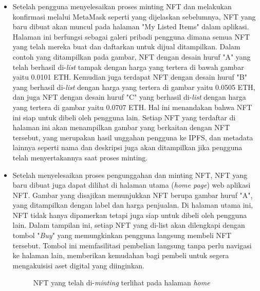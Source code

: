 \begin{itemize}
      \item Setelah pengguna menyelesaikan proses minting NFT dan melakukan konfirmasi melalui MetaMask seperti yang dijelaskan sebelumnya, NFT yang baru dibuat akan muncul pada halaman "My Listed Items" dalam aplikasi. Halaman ini berfungsi sebagai galeri pribadi pengguna dimana semua NFT yang telah mereka buat dan daftarkan untuk dijual ditampilkan. Dalam contoh yang ditampilkan pada gambar, NFT dengan desain huruf "A" yang telah berhasil di-\emph{list} tampak dengan harga yang tertera di bawah gambar yaitu 0.0101 ETH. Kemudian juga terdapat NFT dengan desain huruf "B" yang berhasil di-\emph{list} dengan harga yang tertera di gambar yaitu 0.0505 ETH, dan juga NFT dengan desain huruf "C" yang berhasil di-\emph{list} dengan harga yang tertera di gambar yaitu 0.0707 ETH. Hal ini menandakan bahwa NFT ini siap untuk dibeli oleh pengguna lain. Setiap NFT yang terdaftar di halaman ini akan menampilkan gambar yang berkaitan dengan NFT tersebut, yang merupakan hasil unggahan pengguna ke IPFS, dan metadata lainnya seperti nama dan deskripsi juga akan ditampilkan jika pengguna telah menyertakannya saat proses minting.
      
      \item Setelah menyelesaikan proses pengunggahan dan minting NFT, NFT yang baru dibuat juga dapat dilihat di halaman utama (\emph{home page}) web aplikasi NFT. Gambar yang disajikan menunjukkan NFT berupa gambar huruf "A", yang ditampilkan dengan label dan harga penjualan. Di halaman utama ini, NFT tidak hanya dipamerkan tetapi juga siap untuk dibeli oleh pengguna lain. Dalam tampilan ini, setiap NFT yang di-list akan dilengkapi dengan tombol "\emph{Buy}" yang memungkinkan pengguna langsung membeli NFT tersebut. Tombol ini memfasilitasi pembelian langsung tanpa perlu navigasi ke halaman lain, memberikan kemudahan bagi pembeli untuk segera mengakuisisi aset digital yang diinginkan. 

      \begin{figure} [H] \centering
        \caption{NFT yang telah di-\emph{minting} terlihat pada halaman \emph{home}}
        \label{fig:listhome}
        \end{figure}


\end{itemize}
